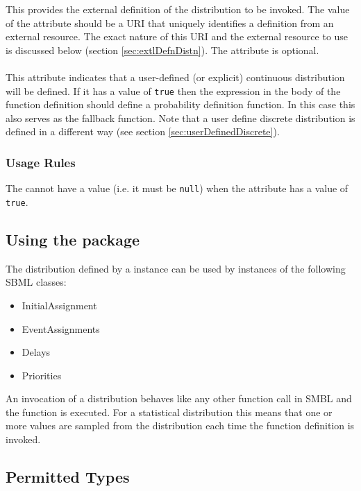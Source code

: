 \documentclass[draftspec]{sbmlpkgspec}
\begin{document}
This provides the external definition of the distribution to be
invoked. The value of the attribute should be a URI that
uniquely identifies a definition from an external resource. The exact
nature of this URI and the external resource to use is discussed below
(section \ref{sec:extlDefnDistn}). The attribute is optional.

\paragraph{}

This attribute indicates that a user-defined (or explicit) continuous
distribution will be defined. If it has a value of \texttt{true} then
the \mathml expression in the body of the function definition should
define a probability definition function. In this case this also
serves as the fallback function. Note that a user define discrete
distribution is defined in a different way (see section
\ref{sec:userDefinedDiscrete}).

\subsubsection{Usage Rules}

The  cannot have a value (i.e.\xspace it must be
\texttt{null}) when the  attribute has a value of
\texttt{true}.

\subsection{Using the \distribshort package}

The distribution defined by a \FunctionDefinition instance can be
used by instances of the following SBML classes:

\begin{itemize}
  \item InitialAssignment
  \item EventAssignments
  \item Delays
  \item Priorities
\end{itemize}

An invocation of a distribution behaves like any other function call
in SMBL and the function is executed. For a statistical distribution
this means that one or more values are sampled from the distribution
each time the function definition is invoked.

\subsection{Permitted Types}
\end{document}
